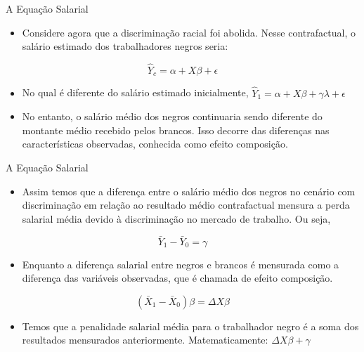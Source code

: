 \documentclass[10pt, xcolor=x11names,compress]{beamer}
\begin{document}
	\begin{frame}{A Equação Salarial}
	\begin{itemize}
		\item Considere agora que a discriminação racial foi abolida. Nesse contrafactual, o salário estimado dos trabalhadores negros seria:
	\end{itemize}
	\begin{equation}
		\hat{Y}_{c} = \alpha + X\beta + \epsilon
	\end{equation}	
	\begin{itemize}
		\item No qual é diferente do salário estimado inicialmente, $\hat{Y}_{1} = \alpha + X\beta +  \gamma \lambda + \epsilon$
		\item No entanto, o salário médio dos negros continuaria sendo diferente do montante médio recebido pelos brancos. Isso decorre das diferenças nas características observadas, conhecida como efeito composição.
	\end{itemize}
	\end{frame}		
		
		
		\begin{frame}{A Equação Salarial}
		\begin{itemize}
			\item Assim temos que a diferença entre o salário médio dos negros no cenário com discriminação em relação ao resultado médio contrafactual mensura a perda salarial média devido à discriminação no mercado de trabalho. Ou seja, 
		\end{itemize}
			\begin{equation}
			\bar{Y}_{1}  - \bar{Y}_{0}  =  \gamma
			\end{equation}	
		\begin{itemize}
			\item Enquanto a diferença salarial entre negros e brancos é mensurada como a diferença das variáveis observadas, que é chamada de efeito composição. 	
		\end{itemize}
			\begin{equation}
			(\bar{X}_{1} - \bar{X}_{0})\beta = \Delta X\beta
			\end{equation}	
		\begin{itemize}
			\item Temos que a penalidade salarial média para o trabalhador negro é a soma dos resultados mensurados anteriormente. Matematicamente: $\Delta X\beta + \gamma$
		\end{itemize}
		\end{frame}
	
\end{document}
